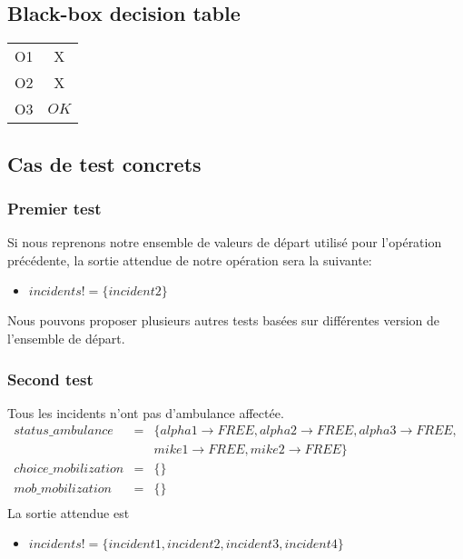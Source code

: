 \documentclass{report}
\begin{document}
\subsection{Black-box decision table}

\begin{tabular}{|c|c|}
	\hline
	O1 & X \\
	O2 & X \\
	O3 & $OK$ \\
	\hline
\end{tabular}

\subsection{Cas de test concrets}

\subsubsection{Premier test}
Si nous reprenons notre ensemble de valeurs de départ utilisé pour l'opération
précédente, la sortie attendue de notre opération sera la suivante:
\begin{itemize}
	\item $incidents! = \{incident2\}$
\end{itemize}

Nous pouvons proposer plusieurs autres tests basées sur différentes
version de l'ensemble de départ.

\subsubsection{Second test}
Tous les incidents n'ont pas d'ambulance affectée. 
\begin{eqnarray*}
status\_ambulance &=& \{alpha1 \rightarrow FREE, alpha2 \rightarrow FREE, alpha3 \rightarrow FREE, \\ 
	&& mike1 \rightarrow FREE, mike2 \rightarrow FREE\} \\
choice\_mobilization &=& \{\} \\
mob\_mobilization &=& \{\} \\
\end{eqnarray*}
La sortie attendue est 
\begin{itemize}
	\item $incidents! = \{incident1, incident2, incident3, incident4\}$
\end{itemize}
\end{document}
